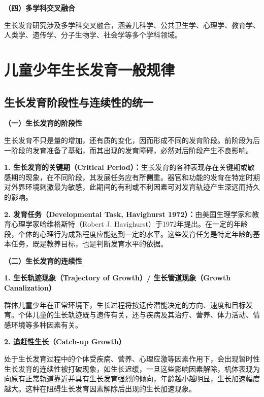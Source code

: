 \begin{keybox}
\textbf{（四）多学科交叉融合}

生长发育研究涉及多学科交叉融合，涵盖儿科学、公共卫生学、心理学、教育学、人类学、遗传学、分子生物学、社会学等多个学科领域。
\end{keybox}

\section{儿童少年生长发育一般规律}

\subsection{生长发育阶段性与连续性的统一}

\begin{keybox}
\textbf{（一）生长发育的阶段性}

生长发育不只是量的增加，还有质的变化，因而形成不同的发育阶段。前阶段为后一阶段的发育准备了基础，而其出现的发育障碍，必然对后阶段产生不良影响。

\textbf{1. 生长发育的关键期（Critical Period）：}生长发育的各种表现存在关键期或敏感期的现象，在不同阶段，其发展任务应有所侧重。器官和功能的发育在特定时期对外界环境刺激最为敏感，此期间的有利或不利因素可对发育轨迹产生深远而持久的影响。

\textbf{2. 发育任务（Developmental Task, Havighurst 1972）：}由美国生理学家和教育心理学家哈维格斯特（Robert J. Havighurst）于1972年提出。在一定的年龄段，个体的心理行为成熟程度应能达到一定的水平。这些发育任务是特定年龄的基本任务，既是教养目标，也是判断发育水平的依据。

\textbf{（二）生长发育的连续性}

\textbf{1. 生长轨迹现象（Trajectory of Growth）/ 生长管道现象（Growth Canalization）}

群体儿童少年在正常环境下，生长过程将按遗传潜能决定的方向、速度和目标发育。个体儿童的生长轨迹既与遗传有关，还与疾病及其治疗、营养、体力活动、情感环境等多种因素有关。

\textbf{2. 追赶性生长（Catch-up Growth）}

处于生长发育过程中的个体受疾病、营养、心理应激等因素作用下，会出现暂时性生长发育的连续性被打破现象，如生长迟缓，一旦这些影响因素解除，机体表现为向原有正常轨道靠近并具有生长发育强烈的倾向，年龄越小越明显，生长加速幅度越大。这种在阻碍生长发育因素解除后出现的生长加速现象。
\end{keybox}

